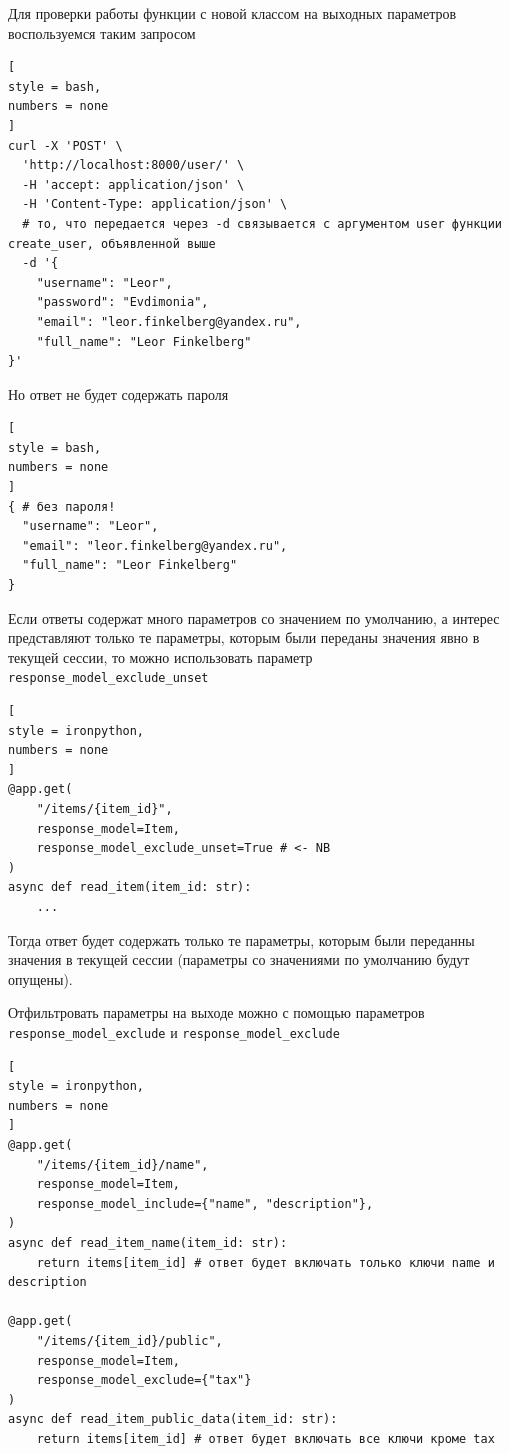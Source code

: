 \documentclass[%
	11pt,
	a4paper,
	utf8,
		]{article}
\begin{document}
Для проверки работы функции с новой классом на выходных параметров воспользуемся таким запросом
\begin{lstlisting}[
style = bash,
numbers = none	
]
curl -X 'POST' \
  'http://localhost:8000/user/' \
  -H 'accept: application/json' \
  -H 'Content-Type: application/json' \
  # то, что передается через -d связывается с аргументом user функции create_user, объявленной выше
  -d '{ 
    "username": "Leor",
    "password": "Evdimonia",
    "email": "leor.finkelberg@yandex.ru",
    "full_name": "Leor Finkelberg"
}'
\end{lstlisting}

Но ответ не будет содержать пароля
\begin{lstlisting}[
style = bash,
numbers = none	
]
{ # без пароля!
  "username": "Leor",
  "email": "leor.finkelberg@yandex.ru",
  "full_name": "Leor Finkelberg"
}
\end{lstlisting}

Если ответы содержат много параметров со значением по умолчанию, а интерес представляют только те параметры, которым были переданы значения явно в текущей сессии, то можно использовать параметр \texttt{response\_model\_exclude\_unset}
\begin{lstlisting}[
style = ironpython,
numbers = none
]
@app.get(
    "/items/{item_id}",
    response_model=Item,
    response_model_exclude_unset=True # <- NB
)
async def read_item(item_id: str):
    ...	
\end{lstlisting}

Тогда ответ будет содержать только те параметры, которым были переданны значения в текущей сессии (параметры со значениями по умолчанию будут опущены).

Отфильтровать параметры на выходе можно с помощью параметров \texttt{response\_model\_exclude} и \texttt{response\_model\_exclude}
\begin{lstlisting}[
style = ironpython,
numbers = none	
]
@app.get(
    "/items/{item_id}/name",
    response_model=Item,
    response_model_include={"name", "description"},
)
async def read_item_name(item_id: str):
    return items[item_id] # ответ будет включать только ключи name и description

@app.get(
    "/items/{item_id}/public",
    response_model=Item,
    response_model_exclude={"tax"}
)
async def read_item_public_data(item_id: str):
    return items[item_id] # ответ будет включать все ключи кроме tax
\end{lstlisting}
\end{document}
